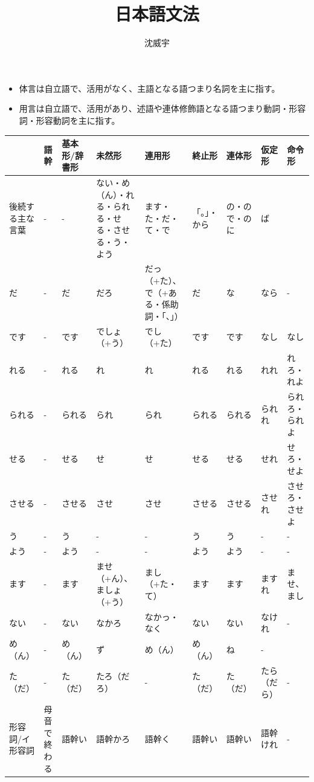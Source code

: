 \documentclass[a4paper,12pt]{article}
\begin{document}
\title{日本語文法}
\author{沈威宇}
\date{\temtoday}
\titletocdoc
{}
\begin{itemize}
\item 体言は自立語で、活用がなく、主語となる語つまり名詞を主に指す。
\item 用言は自立語で、活用があり、述語や連体修飾語となる語つまり動詞・形容詞・形容動詞を主に指す。
\end{itemize}
\begin{longtable}[c]{|C{0.09\textwidth}|C{0.09\textwidth}|C{0.09\textwidth}|C{0.09\textwidth}|C{0.09\textwidth}|C{0.09\textwidth}|C{0.09\textwidth}|C{0.08\textwidth}|C{0.09\textwidth}|}
\hline
 & 語幹 & 基本形/辞書形 & 未然形 & 連用形 & 終止形 & 連体形 & 仮定形 & 命令形 \\\hline\endhead
後続する主な言葉 & - & - & ない・め（ん）・れる・られる・せる・させる・う・よう & ます・た・だ・て・で & 「。」・から & の・ので・のに & ば &  \\\hline
だ & - & だ & だろ & だっ（+た）、で（+ある・係助詞・「、」） & だ & な & なら & - \\\hline
です & - & です & でしょ（+う） & でし（+た） & です & です & なし & なし \\\hline
れる & - & れる & れ & れ & れる & れる & れれ & れろ・れよ \\\hline
られる & - & られる & られ & られ & られる & られる & られれ & られろ・られよ \\\hline
せる & - & せる & せ & せ & せる & せる & せれ & せろ・せよ \\\hline
させる & - & させる & させ & させ & させる & させる & させれ & させろ・させよ \\\hline
う & - & う & - & - & う & う & - & - \\\hline
よう & - & よう & - & - & よう & よう & - & - \\\hline
ます & - & ます & ませ（+ん）、ましょ（+う） & まし（+た・て） & ます & ます & ますれ & ませ、まし \\\hline
ない & - & ない & なかろ & なかっ・なく & ない & ない & なけれ & - \\\hline
め（ん） & - & め（ん） & ず & め（ん） & め（ん） & ね & - \\\hline
た（だ） & - & た（だ） & たろ（だろ） & - & た（だ） & た（だ） & たら（だら） & - \\\hline
形容詞/イ形容詞 & 母音で終わる & 語幹い & 語幹かろ & 語幹く & 語幹い & 語幹い & 語幹けれ & - \\\hline

\end{longtable}
\end{document}
